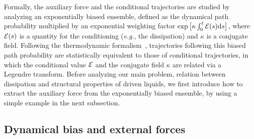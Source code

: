 \documentclass[superscriptaddress, twocolumn, prx, longbibliography, nofootinbib]{revtex4-1}
\newcommand{\tn}[1]{{\color{blue}#1}}
\begin{document}


\tn{Formally, the auxiliary force and the conditional trajectories are studied by analyzing an exponentially biased ensemble, defined as the dynamical path probability multiplied by an exponential weighting factor $\exp\big[\kappa\int_0^t{\cal E}(s){\rm d}s\big]$, where ${\cal E}(s)$ is a quantity for the conditioning ({\it e.g.}, the dissipation) and $\kappa$ is a conjugate field. Following the thermodynamic formalism~\cite{Touchette2009}, trajectories following this biased path probability are statistically equivalent to those of conditional trajectories, in which the conditional value $\cal E$ and the conjugate field $\kappa$ are related via a Legendre transform. Before analyzing our main problem, relation between dissipation and structural properties of driven liquids, we first introduce how to extract the auxiliary force from the exponentially biased ensemble, by using a simple example in the next subsection.}




\subsection{{Dynamical bias and external forces}}\label{sec:biasexternal}
\end{document}

